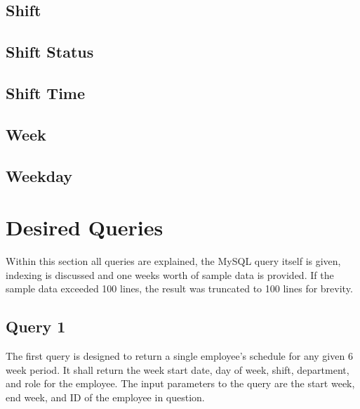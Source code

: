 \documentclass[letter,12pt]{texMemo}
\begin{document}
	\subsection*{Shift}
		
	\subsection*{Shift Status}
		
	\subsection*{Shift Time}
		
	\subsection*{Week}
		
	\subsection*{Weekday}
		

\section*{Desired Queries}
Within this section all queries are explained, the MySQL query itself is given, indexing is discussed and one weeks worth of sample data is provided. If the sample data exceeded 100 lines, the result was truncated to 100 lines for brevity.
\subsection*{Query 1}
The first query is designed to return a single employee's schedule for any given 6 week period. It shall return the week start date, day of week, shift, department, and role for the employee. The input parameters to the query are the start week, end week, and ID of the employee in question.
\end{document}
